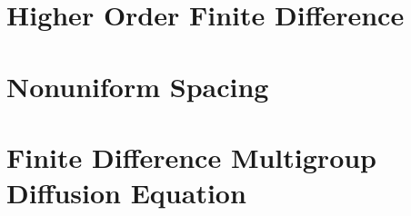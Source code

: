 \section{Higher Order Finite Difference}

\section{Nonuniform Spacing}
\label{subsec:fdm_nonuniform}


\section{Finite Difference Multigroup Diffusion Equation}

